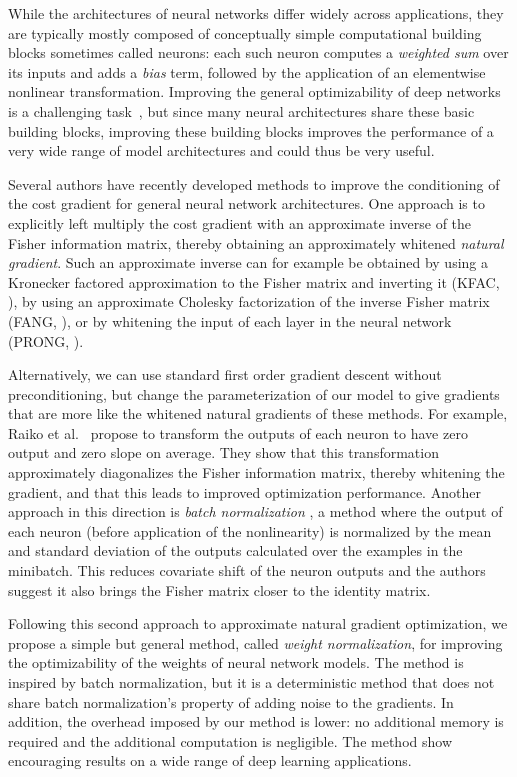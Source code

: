 \documentclass{article}
\begin{document}
While the architectures of neural networks differ widely across applications, they are typically mostly composed of conceptually simple computational building blocks sometimes called neurons: each such neuron computes a \emph{weighted sum} over its inputs and adds a \emph{bias} term, followed by the application of an elementwise nonlinear transformation. Improving the general optimizability of deep networks is a challenging task~\cite{glorot2010understanding}, but since many neural architectures share these basic building blocks, improving these building blocks improves the performance of a very wide range of model architectures and could thus be very useful.

Several authors have recently developed methods to improve the conditioning of the cost gradient for general neural network architectures. One approach is to explicitly left multiply the cost gradient with an approximate inverse of the Fisher information matrix, thereby obtaining an approximately whitened \emph{natural gradient}. Such an approximate inverse can for example be obtained by using a Kronecker factored approximation to the Fisher matrix and inverting it (KFAC, \cite{martens2015optimizing}), by using an approximate Cholesky factorization of the inverse Fisher matrix (FANG, \cite{grosse2015scaling}), or by whitening the input of each layer in the neural network (PRONG, \cite{desjardins2015natural}).

Alternatively, we can use standard first order gradient descent without preconditioning, but change the parameterization of our model to give gradients that are more like the whitened natural gradients of these methods. For example, Raiko et al.~\cite{raiko2012deep} propose to transform the outputs of each neuron to have zero output and zero slope on average. They show that this transformation approximately diagonalizes the Fisher information matrix, thereby whitening the gradient, and that this leads to improved optimization performance. Another approach in this direction is \emph{batch normalization} \cite{ioffe2015batch}, a method where the output of each neuron (before application of the nonlinearity) is normalized by the mean and standard deviation of the outputs calculated over the examples in the minibatch. This reduces covariate shift of the neuron outputs and the authors suggest it also brings the Fisher matrix closer to the identity matrix.

Following this second approach to approximate natural gradient optimization, we propose a simple but general method, called \emph{weight normalization}, for improving the optimizability of the weights of neural network models. The method is inspired by batch normalization, but it is a deterministic method that does not share batch normalization's property of adding noise to the gradients. In addition, the overhead imposed by our method is lower: no additional memory is required and the additional computation is negligible. The method show encouraging results on a wide range of deep learning applications.
\end{document}
